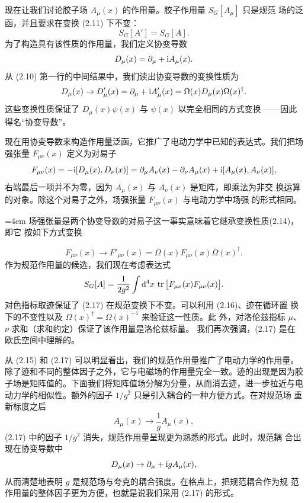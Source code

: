 现在让我们讨论胶子场 $A_\mu(x)$ 的作用量。胶子作用量 $S_G[A_\mu]$ 只是规范
场的泛函，并且要求在变换 (2.11) 下不变：
\begin{equation}
  S_G[A'] = S_G[A] .
\end{equation}
为了构造具有该性质的作用量，我们定义协变导数
\begin{equation}
  D_\mu(x) = \partial_\mu + \mathrm{i} A_\mu(x) .
\end{equation}
从 (2.10) 第一行的中间结果中，我们读出协变导数的变换性质为
\begin{equation}
  D_\mu(x) \to D'_\mu(x) = \partial_\mu + \mathrm{i} A'_\mu(x)
  = \Omega(x) D_\mu(x) \Omega(x)^\dagger .
\end{equation}
这些变换性质保证了 $D_\mu(x)\psi(x)$ 与 $\psi(x)$ 以完全相同的方式变换
——因此得名“协变导数”。

现在用协变导数来构造作用量泛函，它推广了电动力学中已知的表达式。我们把场
强张量 $F_{\mu\nu}(x)$ 定义为对易子
\begin{equation}
  F_{\mu\nu}(x) = -\mathrm{i} [D_\mu(x), D_\nu(x)]
  = \partial_\mu A_\nu(x) - \partial_\nu A_\mu(x)
    + \mathrm{i} [A_\mu(x), A_\nu(x)] ,
\end{equation}
右端最后一项并不为零，因为 $A_\mu(x)$ 与 $A_\nu(x)$ 是矩阵，即乘法为非交
换运算的对象。除这个对易子之外，场强张量 $F_{\mu\nu}(x)$ 与电动力学中场强
的形式相同。

\begingroup\emergencystretch=4em 场强张量是两个协变导数的对易子这一事实意味着它继承变换性质\linebreak[0] (2.14)，即它
按如下方式变换\par\endgroup
\begin{equation}
  F_{\mu\nu}(x) \to F'_{\mu\nu}(x) = \Omega(x) F_{\mu\nu}(x) \Omega(x)^\dagger .
\end{equation}
作为规范作用量的候选，我们现在考虑表达式
\begin{equation}
  S_G[A] = \frac{1}{2 g^2} \int \mathrm{d}^4 x\,
    \operatorname{tr}\big[F_{\mu\nu}(x) F_{\mu\nu}(x)\big] .
\end{equation}
对色指标取迹保证了 (2.17) 在规范变换下不变。可以利用 (2.16)、迹在循环置
换下的不变性以及 $\Omega(x)^\dagger = \Omega(x)^{-1}$ 来验证这一性质。此
外，对洛伦兹指标 $\mu$、$\nu$ 求和（求和约定）保证了该作用量是洛伦兹标量。
我们再次强调，(2.17) 是在欧氏空间中理解的。

从 (2.15) 和 (2.17) 可以明显看出，我们的规范作用量推广了电动力学的作用量。
除了迹和不同的整体因子之外，它与电磁场的作用量完全一致。迹的出现是因为胶
子场是矩阵值的。下面我们将矩阵值场分解为分量，从而消去迹，进一步拉近与电
动力学的相似性。额外的因子 $1/g^2$ 只是引入耦合的一种方便方式。在对规范场
重新标度之后
\begin{equation}
  A_\mu(x) \to \frac{1}{g} A_\mu(x) ,
\end{equation}
(2.17) 中的因子 $1/g^2$ 消失，规范作用量呈现更为熟悉的形式。此时，规范耦
合出现在协变导数中
\begin{equation}
  D_\mu(x) \to \partial_\mu + \mathrm{i} g A_\mu(x) ,
\end{equation}
从而清楚地表明 $g$ 是规范场与夸克的耦合强度。在格点上，把规范耦合作为规
范作用量的整体因子更为方便，也就是说我们采用 (2.17) 的形式。

